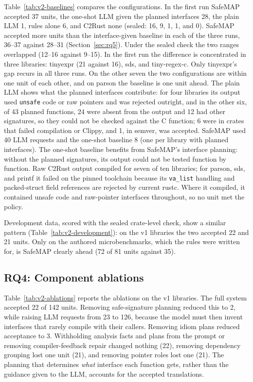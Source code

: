\documentclass[pdflatex,sn-basic]{sn-jnl}
\newcommand{\tool}{SafeMAP\xspace}
\begin{document}
Table~\ref{tab:v2-baselines} compares the configurations. In the first run
\tool accepted 37 units, the one-shot LLM given the planned interfaces 28, the
plain LLM 1, rules alone 6, and C2Rust none (sealed: 16, 9, 1, 1, and 0).
\tool accepted more units than the interface-given baseline in each of the
three runs, 36--37 against 28--31 (Section~\ref{sec:rq5}). Under the sealed
check the two ranges overlapped (12--16 against 9--15). In the first run the
difference is concentrated in three libraries: tinyexpr (21 against 16), sds,
and tiny-regex-c. Only tinyexpr's gap recurs in all three runs. On the other seven the two configurations are within one unit
of each other, and on parson the baseline is one unit ahead. The plain LLM shows what the planned
interfaces contribute: for four libraries its output used \texttt{unsafe}
code or raw pointers and was rejected outright, and in the other six, of 43 planned
functions, 24 were absent from the output and 12 had other signatures, so
they could not be checked against the C function; 6 were in crates that
failed compilation or Clippy, and 1, in semver, was accepted. \tool used 40 LLM
requests and the one-shot baseline 8 (one per library with planned
interfaces). The one-shot baseline benefits from \tool's interface planning:
without the planned signatures, its output could not be tested function by
function. Raw C2Rust output compiled for seven of ten libraries; for parson,
sds, and printf it failed on the pinned toolchain because its
\texttt{va\_list} handling and packed-struct field references are rejected by
current rustc. Where it compiled, it contained unsafe code and raw-pointer
interfaces throughout, so no unit met the policy.



Development data, scored with the sealed crate-level check, show a similar
pattern (Table~\ref{tab:v2-development}): on the v1 libraries the two
accepted 22 and 21 units. Only on the authored
microbenchmarks, which the rules were written for, is \tool clearly ahead
(72 of 81 units against 35).



\subsection{RQ4: Component ablations}

Table~\ref{tab:v2-ablations} reports the ablations on the v1 libraries.
The full system accepted 22 of 142 units. Removing safe-signature planning
reduced this to 2, while raising LLM requests from 23 to 126, because the model must
then invent interfaces that rarely compile with their callers. Removing idiom
plans reduced acceptance to 3. Withholding analysis facts and plans from the
prompt or removing compiler-feedback repair changed nothing (22), removing
dependency grouping lost one unit (21), and removing pointer roles lost one
(21). The planning that determines \emph{what} interface each
function gets, rather than the guidance given to the LLM, accounts for the
accepted translations.
\end{document}

